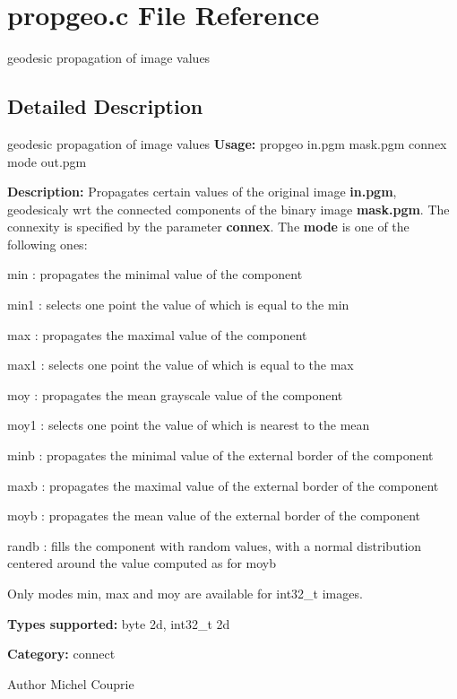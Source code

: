 \section{propgeo.c File Reference}
\label{propgeo_8c}


geodesic propagation of image values  




\subsection{Detailed Description}
geodesic propagation of image values {\bfseries Usage:} propgeo in.pgm mask.pgm connex mode out.pgm

{\bfseries Description:} Propagates certain values of the original image {\bfseries in.pgm}, geodesicaly wrt the connected components of the binary image {\bfseries mask.pgm}. The connexity is specified by the parameter {\bfseries connex}. The {\bfseries mode} is one of the following ones: \begin{DoxyItemize}
\item min : propagates the minimal value of the component \item min1 : selects one point the value of which is equal to the min \item max : propagates the maximal value of the component \item max1 : selects one point the value of which is equal to the max \item moy : propagates the mean grayscale value of the component \item moy1 : selects one point the value of which is nearest to the mean \item minb : propagates the minimal value of the external border of the component \item maxb : propagates the maximal value of the external border of the component \item moyb : propagates the mean value of the external border of the component \item randb : fills the component with random values, with a normal distribution centered around the value computed as for moyb\end{DoxyItemize}
Only modes min, max and moy are available for int32\_\-t images.

{\bfseries Types supported:} byte 2d, int32\_\-t 2d

{\bfseries Category:} connect

\begin{DoxyAuthor}{Author}
Michel Couprie 
\end{DoxyAuthor}
